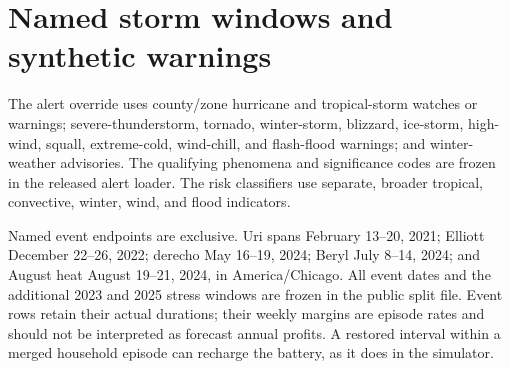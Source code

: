\begin{table}[!htbp]
\centering\small

\caption{Houston 2024 gross outcomes, in dollars per home. Cash and adjusted margins are annualized; daily CVaR and worst seven-block values use complete 24-hour cash blocks (Appendix~\ref{app:repro}). Higher values are preferable. Aging charges are excluded.}
\label{tab:tails}
\end{table}

\begin{table}[!htbp]
\centering\small

\caption{Houston 2024 household tails. Promise $p_5$ is the fifth percentile of household episode-success rates among homes with outages (higher is better). Unserved $p_{95}$ is the 95th percentile of annualized household unserved energy, kWh/home-year (lower is better). These empirical quantiles do not certify household risk budgets.}
\label{tab:households}
\end{table}

\begin{table}[!htbp]
\centering\small

\caption{Houston 2024 seasonal window cohorts, assigned by first local timestamp: DJF (Dec--Feb), MAM (Mar--May), JJA (Jun--Aug), and SON (Sep--Nov). Boundary-crossing windows remain whole; these are not exact calendar-season totals. Hours and episodes are observed; margin is standardized \$/home-week against fixed 20\%. Higher margin/promise is better. The released CSV retains all controllers/datasets and paired window-bootstrap intervals.}
\label{tab:seasonal}
\end{table}
\FloatBarrier
\endgroup

\section{Named storm windows and synthetic warnings}
\label{app:events}

The alert override uses county/zone hurricane and tropical-storm watches or warnings; severe-thunderstorm, tornado, winter-storm, blizzard, ice-storm, high-wind, squall, extreme-cold, wind-chill, and flash-flood warnings; and winter-weather advisories. The qualifying phenomena and significance codes are frozen in the released alert loader. The risk classifiers use separate, broader tropical, convective, winter, wind, and flood indicators.

Named event endpoints are exclusive. Uri spans February 13--20, 2021; Elliott December 22--26, 2022; derecho May 16--19, 2024; Beryl July 8--14, 2024; and August heat August 19--21, 2024, in America/Chicago. All event dates and the additional 2023 and 2025 stress windows are frozen in the public split file. Event rows retain their actual durations; their weekly margins are episode rates and should not be interpreted as forecast annual profits. A restored interval within a merged household episode can recharge the battery, as it does in the simulator.

